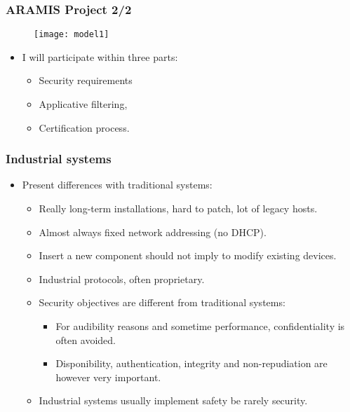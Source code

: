 \documentclass{beamer}
\begin{document}
\begin{frame}
    \frametitle{ARAMIS Project 2/2}

    \begin{figure}[htb]
        \centering
        \texttt{[image: model1]} %
    \end{figure}
    \vfill
    \vspace{-3em}
    \begin{itemize}
        \item I will participate within three parts:
        \begin{itemize}
            \item Security requirements
            \item Applicative filtering,
            \item Certification process.
        \end{itemize}
    \end{itemize}
\end{frame}

\begin{frame}
    \frametitle{Industrial systems}

    \begin{itemize}
        \item Present differences with traditional systems:
            \vfill
        \begin{itemize}
            \item Really long-term installations, hard to patch, lot of legacy hosts.
                \vfill
            \item Almost always fixed network addressing (no DHCP).
                \vfill
            \item Insert a new component should not imply to modify existing devices.
                \vfill
            \item Industrial protocols, often proprietary.
                \vfill
            \item Security objectives are different from traditional systems:
            \begin{itemize}
                \item For audibility reasons and sometime performance, confidentiality is often avoided.
                \item Disponibility, authentication, integrity and non-repudiation are however very important.
            \end{itemize}
                \vfill
            \item Industrial systems usually implement safety be rarely security.
        \end{itemize}
    \end{itemize}
\end{frame}
\end{document}

